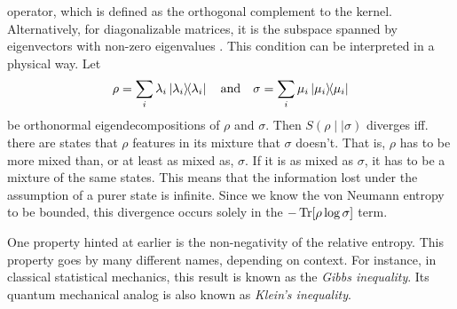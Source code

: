 operator, which is defined as the orthogonal complement to the kernel.
Alternatively, for diagonalizable matrices, it is the subspace spanned by
eigenvectors with non-zero eigenvalues
\cite{leditzkyRelativeEntropiesTheir2016,schumacherRelativeEntropyQuantum2000}.
This condition can be interpreted in a physical way. Let
\[
  \rho = \sum_i \lambda_i \dyad{\lambda_i} \quad{\text{and}} \quad
  \sigma = \sum_i \mu_i \dyad{\mu_i}
\]
be orthonormal eigendecompositions of $\rho$ and $\sigma$.
Then $S(\rho\mid\mid\sigma)$ diverges iff. there are states that $\rho$
features in its mixture that $\sigma$ doesn't. That is, $\rho$ has to be more
mixed than, or at least as mixed as, $\sigma$. If it is as mixed as
$\sigma$, it has to be a mixture of the same states. This means that the
information lost under the assumption of a purer state is infinite.
Since we know the von Neumann entropy to be bounded, this divergence occurs
solely in the $-\Tr[\rho\log\sigma]$ term. 

One property hinted at earlier is the non-negativity of the relative entropy.
This property goes by many different names, depending on context. For instance,
in classical statistical mechanics, this result is known as the \emph{Gibbs
inequality}. Its quantum mechanical analog is also known as \emph{Klein's
inequality}.
